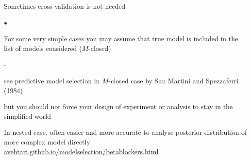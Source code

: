 \documentclass[english,t]{beamer}
\newenvironment{list1}{
   \begin{list}{$\color{list1}\bullet$}{\itemsep=6pt}}{
  \end{list}}
\newenvironment{list2}{
  \begin{list}{-}{\baselineskip=12pt\itemsep=2pt}}{
  \end{list}}
\begin{document}
\begin{frame}{}

{\Large\color{navyblue} Sometimes cross-validation is not needed}

\begin{list1}
\item<+-> For some very simple cases you may assume that true model
  is included in the list of models considered ($M$-closed)
  \begin{list2}
  \item<+-> see predictive model selection in $M$-closed case by
    San Martini and Spezzaferri (1984)
  \item<+-> but you should not force your design of experiment or
    analysis to stay in the simplified world
  \end{list2}
\item<+-> In nested case, often easier and
  more accurate to analyse posterior distribution of more complex
  model directly \\
  {\small \url{avehtari.github.io/modelselection/betablockers.html}}
\end{list1}

\end{frame}
\end{document}
